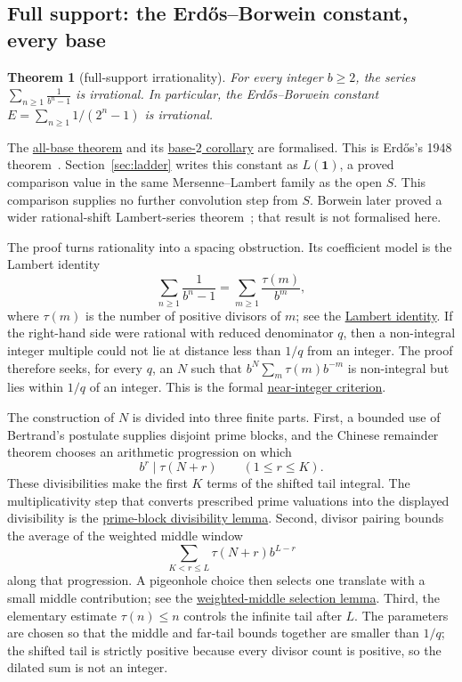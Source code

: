 \documentclass[11pt]{article}
\newcommand{\commit}{312b96c0d149ed466725c62d4ef24cfc91bca34e}
\newcommand{\repobase}{https://github.com/wcook04/plectis-lean-erdos249-257/blob/\commit}
\newcommand{\PK}{Erdos249257}
\newcommand{\lword}[4]{\href{\repobase/\PK/#1\#L#2}{#4}}
\newtheorem{theorem}{Theorem}[section]
\theoremstyle{definition}
\theoremstyle{remark}
\begin{document}
\subsection{Full support: the Erd\H{o}s--Borwein constant, every base}

\begin{theorem}[full-support irrationality]\label{res:full}
For every integer $b\ge2$, the series $\displaystyle\sum_{n\ge1}\frac{1}{b^n-1}$ is
irrational. In particular, the Erd\H{o}s--Borwein constant $E=\sum_{n\ge1}1/(2^n-1)$
is irrational.
\end{theorem}
\noindent The
\lword{CertificateKernel.lean}{8000}{irrational_erdosSum_full_support}{all-base theorem}
and its
\lword{CertificateKernel.lean}{8007}{irrational_erdosBorwein_series}{base-\(2\) corollary}
are formalised.  This is Erd\H{o}s's 1948 theorem~\cite[Theorem, p.~63]{erdos1948}.
Section~\ref{sec:ladder} writes this constant as $L(\mathbf 1)$, a proved
comparison value in the same Mersenne--Lambert family as the open $S$.  This
comparison supplies no further convolution step from $S$.  Borwein later proved a wider
rational-shift Lambert-series
theorem~\cite{borwein1992}; that result is not formalised here.

The proof turns rationality into a spacing obstruction.  Its coefficient
model is the Lambert identity
\[
 \sum_{n\geq 1}\frac{1}{b^n-1}
   =\sum_{m\geq 1}\frac{\tau(m)}{b^m},
\]
where $\tau(m)$ is the number of positive divisors of $m$; see the
\lword{CertificateKernel.lean}{5865}{erdosSum_full_support_eq_tsum_divisor_count}{Lambert identity}.
If the right-hand side were rational with reduced denominator $q$, then a
non-integral integer multiple could not lie at distance less than $1/q$ from an
integer.  The proof therefore seeks, for every $q$, an $N$ such that
$b^N\sum_m\tau(m)b^{-m}$ is non-integral but lies within $1/q$ of an integer.
This is the formal
\lword{CertificateKernel.lean}{5792}{irrational_of_int_mul_near_int}{near-integer criterion}.

The construction of $N$ is divided into three finite parts.  First, a bounded
use of Bertrand's postulate supplies disjoint prime blocks, and the Chinese remainder
theorem chooses an arithmetic progression on which
\[
        b^r\mid \tau(N+r) \qquad (1\leq r\leq K).
\]
These divisibilities make the first $K$ terms of the shifted tail integral.
The multiplicativity step that converts prescribed prime valuations into the
displayed divisibility is the
\lword{CertificateKernel.lean}{6177}{bpow_dvd_card_divisors_of_exact_prime_block}{prime-block divisibility lemma}.
Second, divisor pairing bounds the average of the weighted middle window
\[
   \sum_{K<r\leq L}\tau(N+r)b^{L-r}
\]
along that progression.  A pigeonhole choice then selects one translate with a
small middle contribution; see the
\lword{CertificateKernel.lean}{7246}{exists_first_block_progression_with_selected_weighted_middle}{weighted-middle selection lemma}.
Third, the elementary estimate $\tau(n)\leq n$ controls the infinite tail after
$L$.  The parameters are chosen so that the middle and far-tail bounds together
are smaller than $1/q$; the shifted tail is strictly positive because every
divisor count is positive, so the dilated sum is not an integer.
\end{document}
